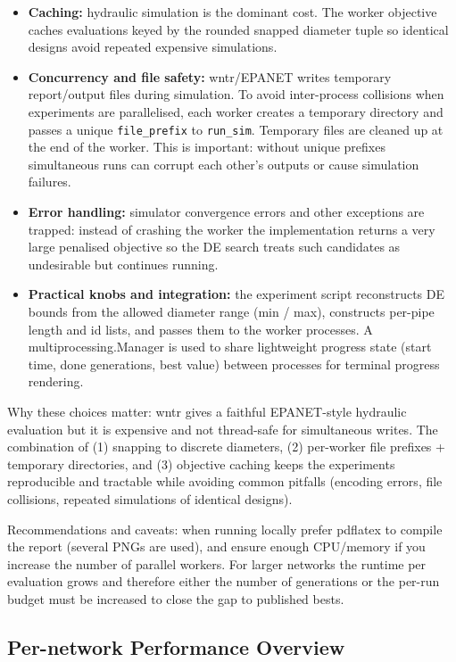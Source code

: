 \documentclass[12pt, a4paper]{article}
\begin{document}
\begin{itemize}
	\item \textbf{Caching:} hydraulic simulation is the dominant cost. The worker objective caches evaluations keyed by the rounded snapped diameter tuple so identical designs avoid repeated expensive simulations.
	\item \textbf{Concurrency and file safety:} wntr/EPANET writes temporary report/output files during simulation. To avoid inter-process collisions when experiments are parallelised, each worker creates a temporary directory and passes a unique \texttt{file\_prefix} to \texttt{run\_sim}. Temporary files are cleaned up at the end of the worker. This is important: without unique prefixes simultaneous runs can corrupt each other's outputs or cause simulation failures.
	\item \textbf{Error handling:} simulator convergence errors and other exceptions are trapped: instead of crashing the worker the implementation returns a very large penalised objective so the DE search treats such candidates as undesirable but continues running.
	\item \textbf{Practical knobs and integration:} the experiment script reconstructs DE bounds from the allowed diameter range (min / max), constructs per-pipe length and id lists, and passes them to the worker processes. A multiprocessing.Manager is used to share lightweight progress state (start time, done generations, best value) between processes for terminal progress rendering.
\end{itemize}

Why these choices matter: wntr gives a faithful EPANET-style hydraulic evaluation but it is expensive and not thread-safe for simultaneous writes. The combination of (1) snapping to discrete diameters, (2) per-worker file prefixes + temporary directories, and (3) objective caching keeps the experiments reproducible and tractable while avoiding common pitfalls (encoding errors, file collisions, repeated simulations of identical designs).

Recommendations and caveats: when running locally prefer pdflatex to compile the report (several PNGs are used), and ensure enough CPU/memory if you increase the number of parallel workers. For larger networks the runtime per evaluation grows and therefore either the number of generations or the per-run budget must be increased to close the gap to published bests.


\subsection{Per-network Performance Overview}
\end{document}
